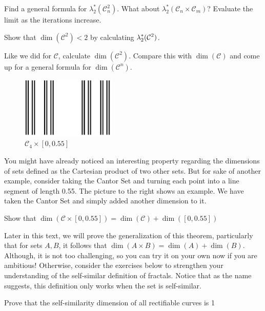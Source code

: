 \begin{exercise}
    Find a general formula for $\lambda^*_2(\mathcal{C}^2_n)$. What about $\lambda^*_2(\mathcal{C}_n\times \mathcal{C}_m)$? Evaluate the limit as the iterations increase.
\end{exercise}

\begin{exercise}
    Show that $\dim(\mathcal{C}^2)<2$ by calculating $\displaystyle \lambda^*_2(\mathcal{C}^2)$.  
\end{exercise}

\begin{exercise}
    Like we did for $\mathcal{C}$, calculate $\dim(\mathcal{C}^2)$. Compare this with $\dim(\mathcal{C})$ and come up for a general formula for $\dim(\mathcal{C}^n)$. 
\end{exercise}


\begin{figure}
  \begin{center}
  \vspace{-\intextsep}
    \includegraphics[width=0.4\textwidth]{Images/1.4.5.png}
  \end{center}
  \caption{$\mathcal{C}_4\times [0,0.55]$}
\end{figure}


You might have already noticed an interesting property regarding the dimensions of sets defined as the Cartesian product of two other sets. But for sake of another example, consider taking the Cantor Set and turning each point into a line segment of length 0.55. The picture to the right shows an example. We have taken the Cantor Set and simply added another dimension to it. 

\clearpage

\begin{exercise}
    Show that $\dim\left(\mathcal{C}\times [0,0.55]\right) = \dim(\mathcal{C})+\dim([0,0.55])$
\end{exercise}

Later in this text, we will prove the generalization of this theorem, particularly that for sets $A,B$, it follows that $\dim(A\times B)=\dim(A)+\dim(B)$. Although, it is not too challenging, so you can try it on your own now if you are ambitious! Otherwise, consider the exercises below to strengthen your understanding of the self-similar definition of fractals. Notice that as the name suggests, this definition only works when the set is self-similar. 

\begin{exercise}
    
\end{exercise}

\begin{exercise}
    
\end{exercise}

\begin{exercise}
    Prove that the self-similarity dimension of all rectifiable curves is 1
\end{exercise}